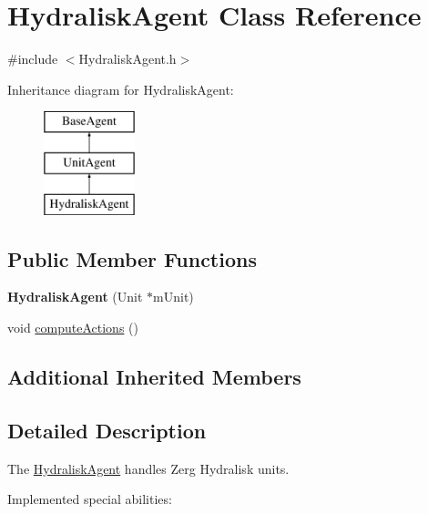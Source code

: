 \hypertarget{class_hydralisk_agent}{\section{Hydralisk\-Agent Class Reference}
\label{class_hydralisk_agent}
}


{\ttfamily \#include $<$Hydralisk\-Agent.\-h$>$}

Inheritance diagram for Hydralisk\-Agent\-:\begin{figure}[H]
\begin{center}
\leavevmode
\includegraphics[height=3.000000cm]{class_hydralisk_agent}
\end{center}
\end{figure}
\subsection*{Public Member Functions}
\begin{DoxyCompactItemize}
\item 
\hypertarget{class_hydralisk_agent_a90f5938be26bceb15368a7618b89f7e6}{{\bfseries Hydralisk\-Agent} (Unit $\ast$m\-Unit)}\label{class_hydralisk_agent_a90f5938be26bceb15368a7618b89f7e6}

\item 
void \hyperlink{class_hydralisk_agent_a0f762bccecf98e58feeaf1991c5f8d8e}{compute\-Actions} ()
\end{DoxyCompactItemize}
\subsection*{Additional Inherited Members}


\subsection{Detailed Description}
The \hyperlink{class_hydralisk_agent}{Hydralisk\-Agent} handles Zerg Hydralisk units.

Implemented special abilities\-:
\begin{DoxyItemize}
\item 
\end{DoxyItemize}

